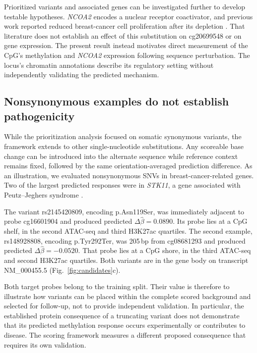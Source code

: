 \documentclass[11pt,letterpaper,twocolumn]{article}
\begin{document}
Prioritized variants and associated genes can be investigated further to develop testable hypotheses. \textit{NCOA2} encodes a nuclear receptor coactivator, and previous work reported reduced breast-cancer cell proliferation after its depletion \cite{cai2019ncoa2}. That literature does not establish an effect of this substitution on cg20699548 or on gene expression. The present result instead motivates direct measurement of the CpG's methylation and \textit{NCOA2} expression following sequence perturbation. The locus's chromatin annotations describe its regulatory setting without independently validating the predicted mechanism.

\subsection{Nonsynonymous examples do not establish pathogenicity}
While the prioritization analysis focused on somatic synonymous variants, the framework extends to other single-nucleotide substitutions. Any scoreable base change can be introduced into the alternate sequence while reference context remains fixed, followed by the same orientation-averaged prediction difference. As an illustration, we evaluated nonsynonymous SNVs in breast-cancer-related genes. Two of the largest predicted responses were in \textit{STK11}, a gene associated with Peutz--Jeghers syndrome \cite{lipsa2019stk11}.

The variant rs2145420809, encoding p.Asn119Ser, was immediately adjacent to probe cg16601904 and produced predicted $\Delta\widehat\beta=0.0890$. Its probe lies at a CpG shelf, in the second ATAC-seq and third H3K27ac quartiles. The second example, rs148928808, encoding p.Tyr292Ter, was 205\,bp from cg08681293 and produced predicted $\Delta\widehat\beta=-0.0520$. That probe lies at a CpG shore, in the third ATAC-seq and second H3K27ac quartiles. Both variants are in the gene body on transcript NM\_000455.5 (Fig.~\ref{fig:candidates}c).

Both target probes belong to the training split. Their value is therefore to illustrate how variants can be placed within the complete scored background and selected for follow-up, not to provide independent validation. In particular, the established protein consequence of a truncating variant does not demonstrate that its predicted methylation response occurs experimentally or contributes to disease. The scoring framework measures a different proposed consequence that requires its own validation.
\end{document}
